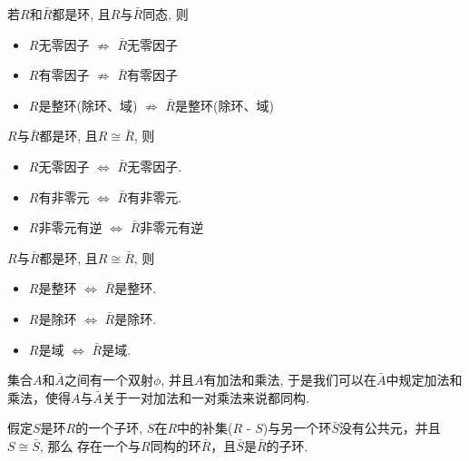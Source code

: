 \begin{Proposition}
若$R$和$\bar{R}$都是环, 且$R$与$\bar{R}$同态, 则
\begin{itemize}
	\item $R$无零因子 $\not\Rightarrow$ $\bar{R}$无零因子
	\item $R$有零因子 $\not\Rightarrow$ $\bar{R}$有零因子
	\item $R$是整环(除环、域) $\not\Rightarrow$ $\bar{R}$是整环(除环、域)
\end{itemize}
\end{Proposition}

\begin{Proposition}
$R$与$\bar{R}$都是环, 且$R \cong \bar{R}$, 则
\begin{itemize}
	\item $R$无零因子 $\Leftrightarrow$ $\bar{R}$无零因子.
	\item $R$有非零元 $\Leftrightarrow$ $\bar{R}$有非零元.
	\item  $R$非零元有逆 $\Leftrightarrow$ $\bar{R}$非零元有逆
\end{itemize}
\end{Proposition}

\begin{Theorem}
$R$与$\bar{R}$都是环, 且$R \cong \bar{R}$, 则
\begin{itemize}
	\item $R$是整环 $\Leftrightarrow$ $\bar{R}$是整环.
	\item  $R$是除环 $\Leftrightarrow$ $\bar{R}$是除环.
	\item  $R$是域 $\Leftrightarrow$ $\bar{R}$是域.
\end{itemize}
\end{Theorem}


\begin{Lemma}
集合$A$和$\bar{A}$之间有一个双射$\phi$, 并且$A$有加法和乘法, 于是我们可以在$\bar{A}$中规定加法和乘法，使得$A$与$\bar{A}$关于一对加法和一对乘法来说都同构.
\end{Lemma}

\begin{Theorem}
假定$S$是环$R$的一个子环, $S$在$R$中的补集($R$ - $S$)与另一个环$\bar{S}$没有公共元，并且$S \cong \bar{S}$, 那么
存在一个与$R$同构的环$\bar{R}$，且$\bar{S}$是$\bar{R}$的子环.
\end{Theorem}

\newcommand{\StubSize}{0.5em}%


